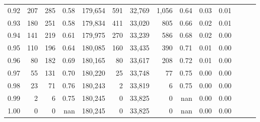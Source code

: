 \begin{tabular}{rrrrrrrrrrrrrr}
0.92 &    207 &  285 &  0.58 &  179,654 &      591 &  32,769 &   1,056 &  0.64 &  0.03 &      0.01 \\
0.93 &    180 &  251 &  0.58 &  179,834 &      411 &  33,020 &     805 &  0.66 &  0.02 &      0.01 \\
0.94 &    141 &  219 &  0.61 &  179,975 &      270 &  33,239 &     586 &  0.68 &  0.02 &      0.00 \\
0.95 &    110 &  196 &  0.64 &  180,085 &      160 &  33,435 &     390 &  0.71 &  0.01 &      0.00 \\
0.96 &     80 &  182 &  0.69 &  180,165 &       80 &  33,617 &     208 &  0.72 &  0.01 &      0.00 \\
0.97 &     55 &  131 &  0.70 &  180,220 &       25 &  33,748 &      77 &  0.75 &  0.00 &      0.00 \\
0.98 &     23 &   71 &  0.76 &  180,243 &        2 &  33,819 &       6 &  0.75 &  0.00 &      0.00 \\
0.99 &      2 &    6 &  0.75 &  180,245 &        0 &  33,825 &       0 &   nan &  0.00 &      0.00 \\
1.00 &      0 &    0 &   nan &  180,245 &        0 &  33,825 &       0 &   nan &  0.00 &      0.00 \\
\bottomrule
\end{tabular}

